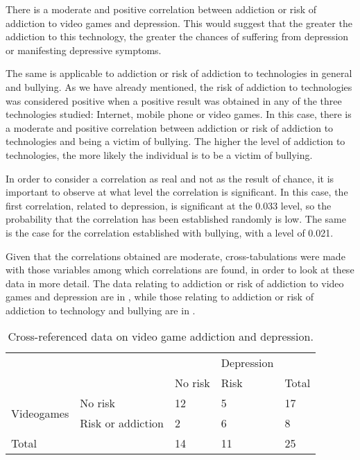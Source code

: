 \documentclass[english]{textolivre}
\begin{document}
There is a moderate and positive correlation between addiction or risk of addiction to video games and depression. This would suggest that the greater the addiction to this technology, the greater the chances of suffering from depression or manifesting depressive symptoms.

The same is applicable to addiction or risk of addiction to technologies in general and bullying. As we have already mentioned, the risk of addiction to technologies was considered positive when a positive result was obtained in any of the three technologies studied: Internet, mobile phone or video games. In this case, there is a moderate and positive correlation between addiction or risk of addiction to technologies and being a victim of bullying. The higher the level of addiction to technologies, the more likely the individual is to be a victim of bullying.

In order to consider a correlation as real and not as the result of chance, it is important to observe at what level the correlation is significant. In this case, the first correlation, related to depression, is significant at the 0.033 level, so the probability that the correlation has been established randomly is low. The same is the case for the correlation established with bullying, with a level of 0.021.

Given that the correlations obtained are moderate, cross-tabulations were made with those variables among which correlations are found, in order to look at these data in more detail. The data relating to addiction or risk of addiction to video games and depression are in , while those relating to addiction or risk of addiction to technology and bullying are in .

\begin{table}[htpb]
\centering
\begin{threeparttable}
\caption{Cross-referenced data on video game addiction and depression.}\label{tbl04}
\begin{tabular}{@{}*{5}{l}@{}}
\toprule
 & & & Depression & \\
 & & No risk & Risk & Total \\
\midrule
\multirow{2}{*}{Videogames} & No risk & 12 & 5 & 17 \\
 & Risk or addiction & 2 & 6 & 8 \\
Total & & 14 & 11 & 25 \\
\bottomrule
\end{tabular}
\end{threeparttable}
\end{table}
\end{document}
